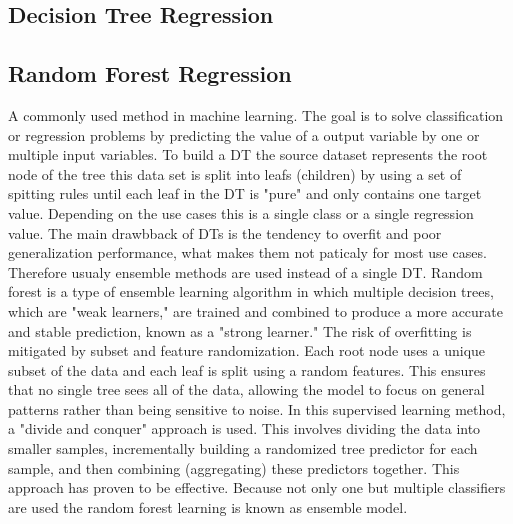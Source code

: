 \subsection{Decision Tree Regression}\label{subsec:decision-tree-regression}

\subsection{Random Forest Regression}\label{subsec:random-forest-regression}
A commonly used method in machine learning. The goal is to solve classification or regression problems by predicting
the value of a output variable by one or multiple input variables. \cite[p. 253]{shaik_briefsurveyrandom_2019}
To build a \ac{DT} the source dataset represents the root node of the tree this data set is split into leafs
(children) by using a set of spitting rules until each leaf in the \ac{DT} is "pure" and only contains one target
value. Depending on the use cases this is a single class or a single regression value. \cite[p.
70-72]{muller_introductionmachinelearning_2016}
The main drawbback of \ac{DT}s is the tendency to overfit and poor generalization performance, what makes them not
paticaly for most use cases. Therefore usualy ensemble methods are used instead of a single \ac{DT}. \cite[p.
78]{muller_introductionmachinelearning_2016} \cite[p. 251]{liu_newmachinelearning_2012}
Random forest \cite[]{breiman_randomforests_2001} is a type of ensemble learning algorithm in which multiple decision
trees, which are "weak learners," are trained and combined to produce a more accurate and stable prediction, known as
a "strong learner." \cite[p. 24]{awad_efficientlearningmachines_2015}
The risk of overfitting is mitigated by subset and feature randomization. Each root node uses a unique subset of the
data and each leaf is split using a random features. This ensures that no single tree sees all of the data, allowing
the model to focus on general patterns rather than being sensitive to noise. \cite[p. 251]{liu_newmachinelearning_2012}
In this supervised learning method,
a "divide and conquer" approach is used. This involves dividing the data into smaller samples, incrementally building
a randomized tree predictor for each sample, and then combining (aggregating) these predictors together. This
approach has proven to be effective. Because not only one but multiple classifiers are used the random forest
learning is known as ensemble model. \cite[p. 254]{shaik_briefsurveyrandom_2019}

